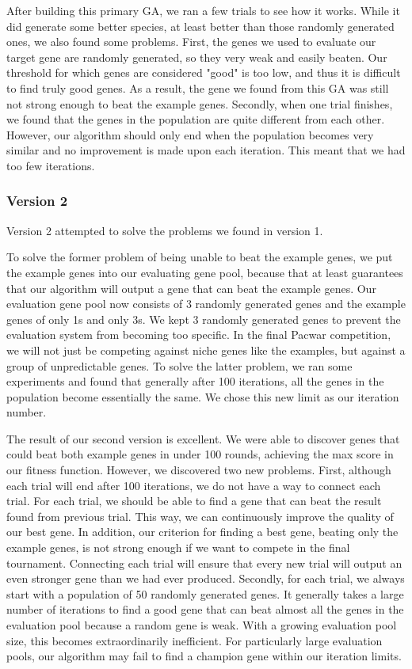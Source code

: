 \documentclass[twoside]{article}
\begin{document}
\begin{multicols}{2}

\noindent After building this primary GA, we ran a few trials to see how it works. While it did generate some better species, at least better than those randomly generated ones, we also found some problems. First, the genes we used to evaluate our target gene are randomly generated, so they very weak and easily beaten. Our threshold for which genes are considered "good" is too low, and thus it is difficult to find truly good genes. As a result, the gene we found from this GA was still not strong enough to beat the example genes. Secondly, when one trial finishes, we found that the genes in the population are quite different from each other. However, our algorithm should only end when the population becomes very similar and no improvement is made upon each iteration. This meant that we had too few iterations.

\subsubsection{Version 2}
Version 2 attempted to solve the problems we found in version 1.

To solve the former problem of being unable to beat the example genes, we put the example genes into our evaluating gene pool, because that at least guarantees that our algorithm will output a gene that can beat the example genes. Our evaluation gene pool now consists of 3 randomly generated genes and the example genes of only 1s and only 3s. We kept 3 randomly generated genes to prevent the evaluation system from becoming too specific. In the final Pacwar competition, we will not just be competing against niche genes like the examples, but against a group of unpredictable genes. To solve the latter problem, we ran some experiments and found that generally after 100 iterations, all the genes in the population become essentially the same. We chose this new limit as our iteration number.

The result of our second version is excellent. We were able to discover genes that could beat both example genes in under 100 rounds, achieving the max score in our fitness function. However, we discovered two new problems. First, although each trial will end after 100 iterations, we do not have a way to connect each trial. For each trial, we should be able to find a gene that can beat the result found from previous trial. This way, we can continuously improve the quality of our best gene. In addition, our criterion for finding a best gene, beating only the example genes, is not strong enough if we want to compete in the final tournament. Connecting each trial will ensure that every new trial will output an even stronger gene than we had ever produced. Secondly, for each trial, we always start with a population of 50 randomly generated genes. It generally takes a large number of iterations to find a good gene that can beat almost all the genes in the evaluation pool because a random gene is weak. With a growing evaluation pool size, this becomes extraordinarily inefficient. For particularly large evaluation pools, our algorithm may fail to find a champion gene within our iteration limits.


\end{multicols}
\end{document}
